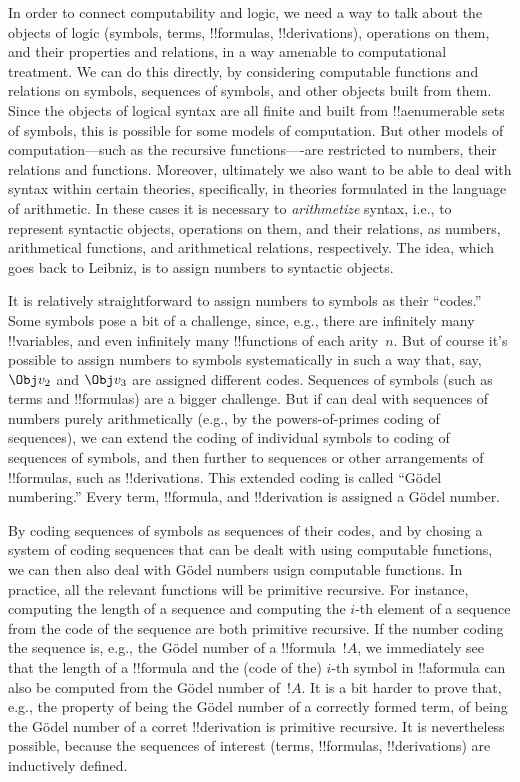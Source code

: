 \documentclass[../../../include/open-logic-section]{subfiles}
\begin{document}

In order to connect computability and logic, we need a way to talk
about the objects of logic (symbols, terms, !!{formula}s,
!!{derivation}s), operations on them, and their properties and
relations, in a way amenable to computational treatment.  We can do
this directly, by considering computable functions and relations on
symbols, sequences of symbols, and other objects built from them.
Since the objects of logical syntax are all finite and built from
!!a{enumerable} sets of symbols, this is possible for some models of
computation.  But other models of computation---such as the recursive
functions----are restricted to numbers, their relations and functions.
Moreover, ultimately we also want to be able to deal with syntax
within certain theories, specifically, in theories formulated in the
language of arithmetic.  In these cases it is necessary to
\emph{arithmetize} syntax, i.e., to represent syntactic objects,
operations on them, and their relations, as numbers, arithmetical
functions, and arithmetical relations, respectively. The idea, which
goes back to Leibniz, is to assign numbers to syntactic objects.

It is relatively straightforward to assign numbers to symbols as their
``codes.''  Some symbols pose a bit of a challenge, since, e.g., there
are infinitely many !!{variable}s, and even infinitely many
!!{function}s of each arity~$n$. But of course it's possible to assign
numbers to symbols systematically in such a way that, say, $\Obj v_2$
and $\Obj v_3$ are assigned different codes. Sequences of symbols
(such as terms and !!{formula}s) are a bigger challenge. But if can
deal with sequences of numbers purely arithmetically (e.g., by the
powers-of-primes coding of sequences), we can extend the coding of
individual symbols to coding of sequences of symbols, and then further
to sequences or other arrangements of !!{formula}s, such as
!!{derivation}s. This extended coding is called ``G\"odel numbering.''
Every term, !!{formula}, and !!{derivation} is assigned a G\"odel
number.

By coding sequences of symbols as sequences of their codes, and by
chosing a system of coding sequences that can be dealt with using
computable functions, we can then also deal with G\"odel numbers usign
computable functions.  In practice, all the relevant functions will be
primitive recursive.  For instance, computing the length of a sequence
and computing the $i$-th element of a sequence from the code of the
sequence are both primitive recursive. If the number coding the
sequence is, e.g., the G\"odel number of a !!{formula}~$!A$, we
immediately see that the length of a !!{formula} and the (code of the)
$i$-th symbol in !!a{formula} can also be computed from the G\"odel
number of~$!A$. It is a bit harder to prove that, e.g., the property
of being the G\"odel number of a correctly formed term, of being the
G\"odel number of a corret !!{derivation} is primitive recursive.  It
is nevertheless possible, because the sequences of interest (terms,
!!{formula}s, !!{derivation}s) are inductively defined.
\end{document}
